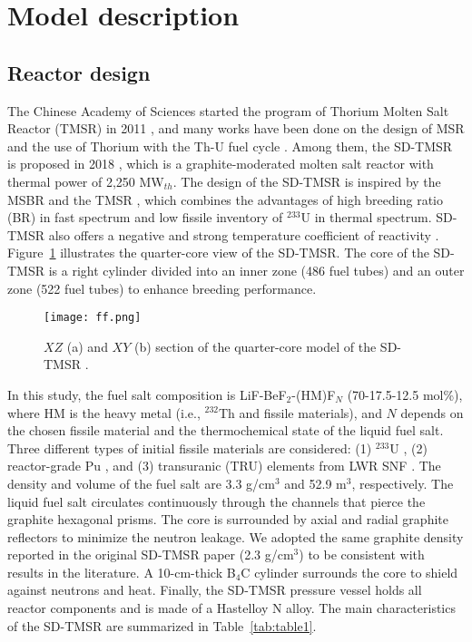 \section{Model description} \label{Model-description}
\subsection{Reactor design}

The Chinese Academy of Sciences started the program of Thorium Molten Salt Reactor (TMSR) in 2011 \cite{jiang2012advanced}, and many works have been done on the design of MSR and the use of Thorium with the Th-U fuel cycle \cite{li2015analysis}. Among them, the SD-TMSR is proposed in 2018 \cite{li_optimization_2018}, which is a graphite-moderated molten salt reactor with thermal power of 2,250 MW$_{th}$. The design of the SD-TMSR is inspired by the \gls{MSBR} \cite{robertson_conceptual_1971} and the \gls{TMSR} \cite{nuttin2005potential}, which combines the advantages of high breeding ratio (BR) in fast spectrum and low fissile inventory of $^{233}$U in thermal spectrum. SD-TMSR also offers a negative and strong temperature coefficient of reactivity \cite{li_optimization_2018}. Figure~\ref{fig:ff} illustrates the quarter-core view of the
SD-TMSR. The core of the 
SD-TMSR is a right cylinder divided into an inner zone (486 fuel tubes) 
and an outer zone (522 fuel tubes) to enhance breeding performance.
\begin{figure} %
	\texttt{[image: ff.png]}
	\caption{$XZ$ (a) and $XY$ (b) section of the quarter-core model of the 
		SD-TMSR \cite{ashraf2019Preliminary}.}
	\label{fig:ff}
\end{figure}
In this study, the fuel salt composition is LiF-BeF$_2$-(HM)F$_N$ (70-17.5-12.5 mol\%),
where HM is the heavy metal (i.e., $^{232}$Th and fissile 
materials), and $N$ depends on the chosen fissile material and the 
thermochemical state of the liquid fuel salt. Three different types of initial 
fissile materials are considered: (1) $^{233}$U \cite{ashraf2020whole}, 
(2) reactor-grade Pu \cite{marka1993explosive}, and (3) transuranic (TRU) 
elements from \gls{LWR} \gls{SNF} \cite{de2000scenarios}.
The density and volume of the fuel salt are 3.3 g/cm$^{3}$ and 52.9 m$^3$, 
respectively. The liquid fuel salt circulates continuously through the channels
that pierce the graphite hexagonal prisms. The core is surrounded by 
axial and radial graphite reflectors to minimize the neutron leakage.
We adopted the same graphite density reported in the original SD-TMSR paper (2.3 g/cm$^3$) \cite{li_optimization_2018} to be consistent with results in the literature.
A 10-cm-thick B$_4$C cylinder surrounds the core to shield against neutrons and heat.
Finally, the SD-TMSR pressure vessel holds all reactor components and is made of 
a Hastelloy N alloy. The main characteristics of the SD-TMSR are 
summarized in Table~\ref{tab:table1}.


